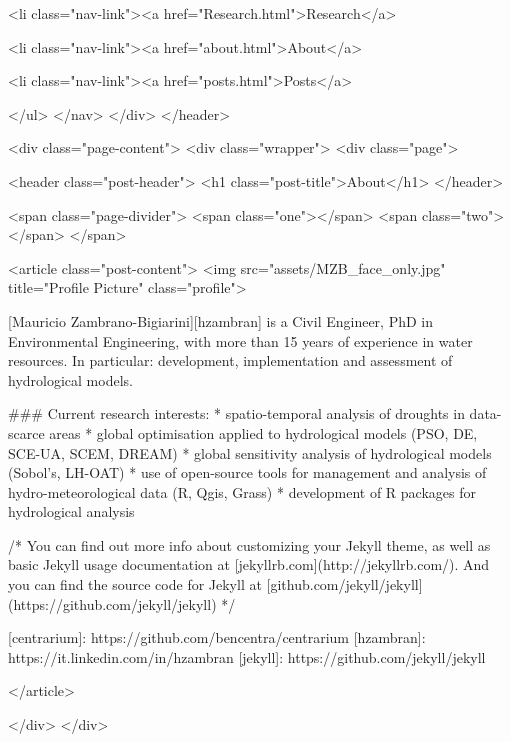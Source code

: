           <li class="nav-link"><a href="Research.html">Research</a>
          
        
          
          <li class="nav-link"><a href="about.html">About</a>
          
        
          
        
          
        
          
        
          
          <li class="nav-link"><a href="posts.html">Posts</a>
          
        
          
        
      </ul>
    </nav>
  </div>
</header>


    <div class="page-content">
        <div class="wrapper">
<div class="page">

  <header class="post-header">
    <h1 class="post-title">About</h1>
  </header>

  <span class="page-divider">
  <span class="one"></span>
  <span class="two"></span>
</span>


  <article class="post-content">
    <img src="assets/MZB_face_only.jpg" title="Profile Picture" class="profile">

[Mauricio Zambrano-Bigiarini][hzambran] is a Civil Engineer, PhD in Environmental Engineering, with more than 15 years of experience in water resources. In particular: development, implementation and assessment of hydrological models.

### Current research interests: 
* spatio-temporal analysis of droughts in data-scarce areas
* global optimisation applied to hydrological models (PSO, DE, SCE-UA, SCEM, DREAM)
* global sensitivity analysis of hydrological models (Sobol's, LH-OAT)
* use of open-source tools for management and analysis of hydro-meteorological data (R, Qgis, Grass)
* development of R packages for hydrological analysis

/* 
You can find out more info about customizing your Jekyll theme, as well as basic Jekyll usage documentation at [jekyllrb.com](http://jekyllrb.com/). And you can find the source code for Jekyll at [github.com/jekyll/jekyll](https://github.com/jekyll/jekyll)
*/

[centrarium]: https://github.com/bencentra/centrarium
[hzambran]: https://it.linkedin.com/in/hzambran
[jekyll]: https://github.com/jekyll/jekyll

  </article>

</div>
</div>

